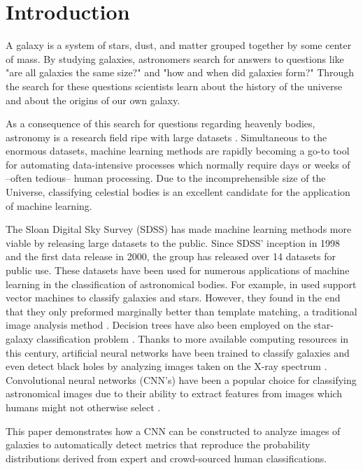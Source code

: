 \section{Introduction}

A galaxy is a system of stars, dust, and matter grouped together by some center of mass. By studying galaxies, astronomers search for answers to questions like "are all galaxies the same size?" and "how and when did galaxies form?" Through the search for these questions scientists learn about the history of the universe and about the origins of our own galaxy.


As a consequence of this search for questions regarding heavenly bodies, astronomy is a research field ripe with large datasets \cite{microsoft-galaxies}. Simultaneous to the enormous datasets, machine learning methods are rapidly becoming a go-to tool for automating data-intensive processes which normally require days or weeks of --often tedious-- human processing. Due to the incomprehensible size of the Universe, classifying celestial bodies is an excellent candidate for the application of machine learning.

The Sloan Digital Sky Survey (SDSS) has made machine learning methods more viable by releasing large datasets to the public. Since SDSS' inception in 1998 and the first data release in 2000, the group has released over 14 datasets for public use. These datasets have been used for numerous applications of machine learning in the classification of astronomical bodies. For example, \citeauthor{svn-galaxy} in \citeyear{svn-galaxy} used support vector machines to classify galaxies and stars. However, they found in the end that they only preformed marginally better than template matching, a traditional image analysis method \cite{svn-galaxy}. Decision trees have also been employed on the star-galaxy classification problem \cite{ball-decision-trees}. Thanks to more available computing resources in this century, artificial neural networks have been trained to classify galaxies and even detect black holes by analyzing images taken on the X-ray spectrum \cite{black-holes}. Convolutional neural networks (CNN's) have been a popular choice for classifying astronomical images due to their ability to extract features from images which humans might not otherwise select \cite{cnn-star-galaxy}.

This paper demonstrates how a CNN can be constructed to analyze images of galaxies to automatically detect metrics that reproduce the probability distributions derived from expert and crowd-sourced human classifications.

